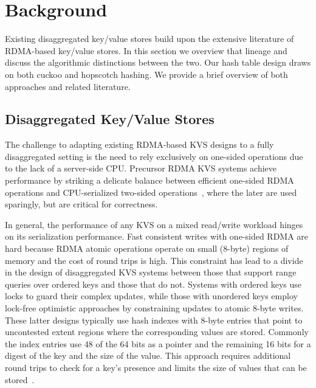 
\section{Background}
\label{sec:background}

Existing disaggregated key/value stores build upon the extensive literature of
RDMA-based key/value stores. In this section we overview that lineage and discuss the algorithmic
distinctions between the two. Our hash table design draws on both cuckoo and hopscotch hashing. We
provide a brief overview of both approaches and related literature.



\subsection{Disaggregated Key/Value Stores}

The challenge to adapting existing RDMA-based KVS designs to a fully
disaggregated setting is the need to rely exclusively on one-sided
operations due to the lack of a server-side CPU.  Precursor RDMA KVS
systems achieve performance by striking a delicate balance between
efficient one-sided RDMA operations and CPU-serialized two-sided
operations~\cite{farm,herd,pilaf,cell,storm}, where the later are used
sparingly, but are critical for correctness.

In general, the performance of any KVS on a mixed read/write workload
hinges on its serialization performance.  Fast consistent writes with
one-sided RDMA are hard because RDMA atomic operations operate on
small (8-byte) regions of memory and the cost of round trips is
high. This constraint has lead to a divide in the design of
disaggregated KVS systems between those that support range queries over
ordered keys and those that do not. Systems with ordered keys use
locks to guard their complex updates, while those
with unordered keys employ lock-free optimistic approaches by
constraining updates to atomic 8-byte writes. These latter designs
typically use hash indexes with 8-byte entries that point to
uncontested extent regions where the corresponding values are stored.
Commonly the index entries use 48 of the 64 bits as a pointer and the
remaining 16 bits for a digest of the key and the size of the value.
This approach requires additional round trips to check for a key's
presence and limits the size of values that can be
stored~\cite{fusee,race}.

